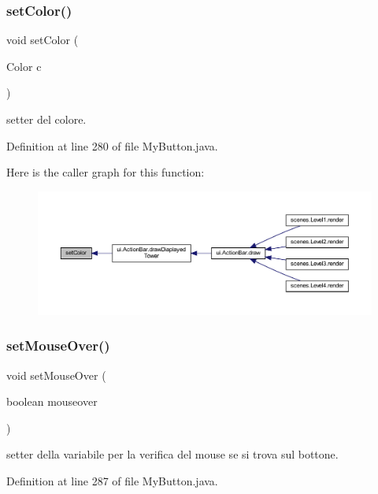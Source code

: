 \subsubsection{\texorpdfstring{set\+Color()}{setColor()}}
{\footnotesize\ttfamily void set\+Color (\begin{DoxyParamCaption}\item[{Color}]{c }\end{DoxyParamCaption})}



setter del colore. 



Definition at line 280 of file My\+Button.\+java.

Here is the caller graph for this function\+:\nopagebreak
\begin{figure}[H]
\begin{center}
\leavevmode
\includegraphics[width=350pt]{classui_1_1_my_button_acecf901c15a2150148863cbc4d0709da_icgraph}
\end{center}
\end{figure}
\mbox{\label{classui_1_1_my_button_ac3f48a7245ffa1fe24d32ea71797997d}} 
\subsubsection{\texorpdfstring{set\+Mouse\+Over()}{setMouseOver()}}
{\footnotesize\ttfamily void set\+Mouse\+Over (\begin{DoxyParamCaption}\item[{boolean}]{mouseover }\end{DoxyParamCaption})}



setter della variabile per la verifica del mouse se si trova sul bottone. 



Definition at line 287 of file My\+Button.\+java.

